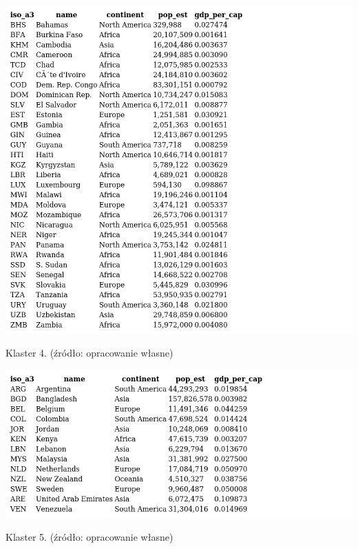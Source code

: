 \documentclass[11pt]{report}
\begin{document}
    \begin{table}[!htp]
        \centering
        \includegraphics[width=\linewidth]{tables/CLUST/clust4kmeans.png}
        \caption{Klaster 4. (źródło: opracowanie własne)}
        \label{tab:cl4}
    \end{table}

    \begin{table}[!htp]
        \centering
        \includegraphics[width=\linewidth]{tables/CLUST/clust5kmeans.png}
        \caption{Klaster 5. (źródło: opracowanie własne)}
        \label{tab:cl5}
    \end{table}
\end{document}
